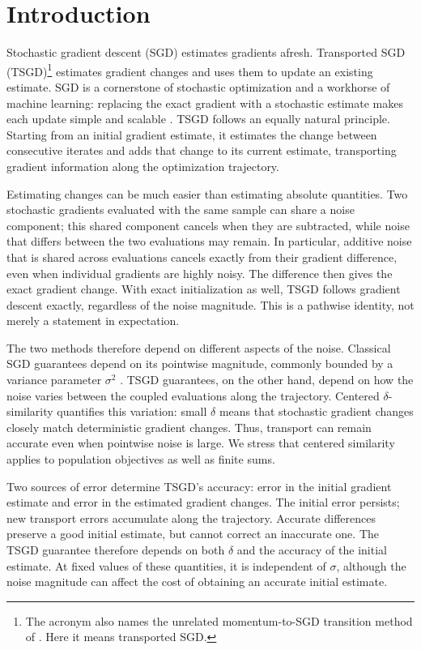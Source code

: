 \section{Introduction}
\label{sec:introduction}

Stochastic gradient descent (SGD) estimates gradients afresh.
Transported SGD (TSGD)\footnote{The acronym also names the unrelated
momentum-to-SGD transition method of
\citet{zeng2021scalingtransitionmomentumstochastic}. Here it means
transported SGD.} estimates gradient changes and uses them to
update an existing estimate. SGD is a cornerstone of stochastic
optimization and a workhorse of machine learning: replacing the exact
gradient with a stochastic estimate makes each update simple and
scalable \citep{bottou2018optimization}. TSGD follows an equally
natural principle. Starting from an initial gradient estimate, it
estimates the change between consecutive iterates and adds that change
to its current estimate, transporting gradient information along the
optimization trajectory.

Estimating changes can be much easier than estimating absolute
quantities. Two stochastic gradients evaluated with the same sample
can share a noise component; this shared component cancels when they
are subtracted, while noise that differs between the two evaluations
may remain. In particular, additive noise that is shared across
evaluations cancels exactly from their gradient difference, even when
individual gradients are highly noisy. The difference then gives the
exact gradient change. With exact initialization as well, TSGD follows
gradient descent exactly, regardless of the noise magnitude. This is a
pathwise identity, not merely a statement in expectation.

The two methods therefore depend on different aspects of the noise.
Classical SGD guarantees depend on its pointwise magnitude, commonly
bounded by a variance parameter $\sigma^2$
\citep{ghadimi2013stochastic}. TSGD guarantees, on the other hand, depend on how
the noise varies between the coupled evaluations along the trajectory.
Centered $\delta$-similarity quantifies this variation: small $\delta$
means that stochastic gradient changes closely match deterministic
gradient changes. Thus, transport can remain accurate even when
pointwise noise is large. We stress that centered similarity applies
to population objectives as well as finite sums.

Two sources of error determine TSGD's accuracy: error in the initial
gradient estimate and error in the estimated gradient changes.
The initial error persists; new transport errors accumulate along the
trajectory. Accurate differences preserve a good initial
estimate, but cannot correct an inaccurate one.
The TSGD guarantee therefore depends on both $\delta$ and the accuracy
of the initial estimate. At fixed values of these quantities, it is
independent of $\sigma$, although the noise magnitude can affect the
cost of obtaining an accurate initial estimate.

